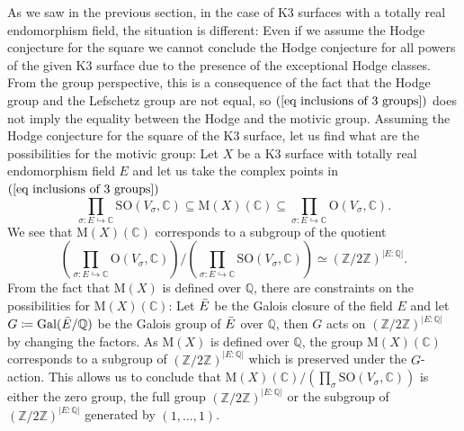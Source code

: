 \documentclass[11pt,twoside,a4paper]{amsart}
\newcommand{\0}{\mathscr{O}}
\newcommand{\Q}{\mathbb{Q}}
\newcommand{\C}{\mathbb{C}}
\newcommand{\s}{\sigma}
\theoremstyle{plain}
\theoremstyle{definition}
\theoremstyle{remark}
\begin{document}
\smallskip

As we saw in the previous section, in the case of K3 surfaces with a totally real endomorphism field, the situation is different: Even if we assume the Hodge conjecture for the square we cannot conclude the Hodge conjecture for all powers of the given K3 surface due to the presence of the exceptional Hodge classes. From the group perspective, this is a consequence of the fact  
that the Hodge group and the Lefschetz group are not equal, so $(\ref{eq inclusions of 3 groups})$ does not imply the equality between the Hodge and the motivic group. Assuming the Hodge conjecture for the square of the K3 surface, let us find what are the possibilities for the motivic group:
Let $X$ be a K3 surface with totally real endomorphism field $E$ and let us take the complex points in $(\ref{eq inclusions of 3 groups})$
\[
\prod_{\sigma\colon E\hookrightarrow \C}\mathrm{SO}(V_\s,\C)
\subseteq \mathrm{M}(X)(\C)\subseteq
\prod_{\sigma\colon E\hookrightarrow \C}\mathrm{O}(V_\s,\C).
\]
We see that $\mathrm{M}(X)(\C)$ corresponds to a subgroup of the quotient 
\[
\left(\prod_{\sigma\colon E\hookrightarrow \C}\mathrm{O}(V_\s,\C)\right)/\left(\prod_{\sigma\colon E\hookrightarrow \C}\mathrm{SO}(V_\s,\C)\right)\simeq (\mathbb{Z}/2\mathbb{Z})^{|E:\Q|}.
\]
From the fact that $\mathrm{M}(X)$ is defined over $\Q$, there are constraints on the possibilities for $\mathrm{M}(X)(\C)$:
Let $\Bar{E}$ be the Galois closure of the field $E$ and let $G\coloneqq \mathrm{Gal}(\Bar{E}/\Q)$ be the Galois group of $\Bar{E}$ over $\Q$, then $G$ acts on $
(\mathbb{Z}/2\mathbb{Z})^{|E:\Q|}$ by changing the factors.
As $\mathrm{M}(X)$ is defined over $\Q$, the group $\mathrm{M}(X)(\C)$ corresponds to a subgroup of $(\mathbb{Z}/2\mathbb{Z})^{|E:\Q|}$ which is preserved under the $G$-action. 
This allows us to conclude that $\mathrm{M}(X)(\C)/\left(\prod
_{\sigma}\mathrm{SO}(V_\s,\C)\right)$ is either the zero group, the full group $(\mathbb{Z}/2\mathbb{Z})^{|E:\Q|}$ or the subgroup of $(\mathbb{Z}/2\mathbb{Z})^{|E:\Q|}$ generated by $(1,\ldots,1)$. 

\smallskip
\end{document}
